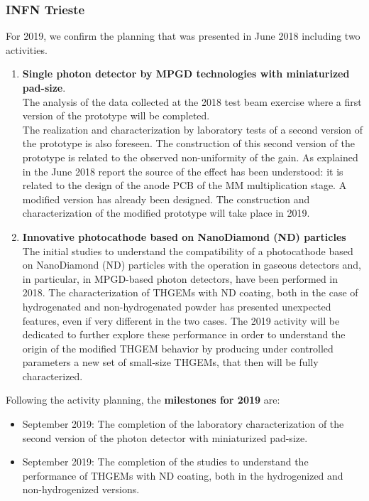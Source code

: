  \subsubsection{INFN Trieste} 
 \label{sec:infn-planned-next}
For 2019, we confirm the planning that was presented in
June 2018 including two activities.
\begin{enumerate}
\item
\textbf{Single photon detector 
by MPGD technologies with 
miniaturized 
pad-size}. \\
The analysis of the data collected at the 2018 
test beam exercise where a first version of the 
prototype will be completed.\\
The realization and characterization by laboratory 
tests of a
second version of the prototype is also foreseen. 
The construction of this second version of the
prototype is 
related to the observed non-uniformity of the gain. 
As explained in the June 2018 report
the source of the effect has been understood:
it is related to the design of the anode PCB 
of the MM multiplication
stage. A modified version has already been designed. 
The construction and characterization 
of the modified prototype
will take place in 2019.
\item
\textbf{Innovative photocathode 
based on NanoDiamond (ND) particles} \\
The initial studies to understand the 
compatibility of a photocathode 
based on NanoDiamond (ND) particles with the 
operation in gaseous detectors and, in 
particular, in MPGD-based photon detectors, 
have been performed in 2018. The characterization of
THGEMs with ND 
coating, both in the case of hydrogenated and
non-hydrogenated powder has presented unexpected
features, even if 
very different in the two cases.
The 2019 activity will be dedicated to further 
explore these 
performance in order to understand the origin of the
modified
THGEM behavior by producing under 
controlled parameters       a new set 
of small-size THGEMs, 
that then will be fully characterized.
\end{enumerate}
\par
Following the activity planning, the 
\textbf{milestones for 2019} are:
\begin{itemize}
\item
September 2019: The completion of the laboratory characterization 
of the second version of the photon detector with miniaturized pad-size.
\item
September 2019: The completion of the studies to understand the performance of THGEMs with ND coating, both in the hydrogenized and non-hydrogenized versions.
\end{itemize}